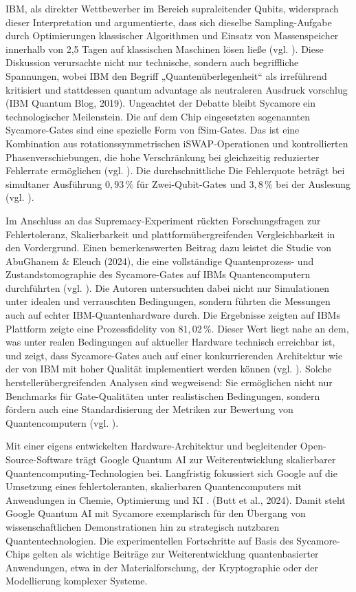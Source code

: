 IBM, als direkter Wettbewerber im Bereich supraleitender Qubits, widersprach dieser Interpretation und argumentierte, dass sich dieselbe Sampling-Aufgabe durch Optimierungen klassischer Algorithmen und Einsatz von Massenspeicher innerhalb von 2,5 Tagen auf klassischen Maschinen lösen ließe (vgl. \cite{pednault_quantum_2019}). Diese Diskussion verursachte nicht nur technische, sondern auch begriffliche Spannungen, wobei IBM den Begriff „Quantenüberlegenheit“ als irreführend kritisiert und stattdessen quantum advantage als neutraleren Ausdruck vorschlug (IBM Quantum Blog, 2019). Ungeachtet der Debatte bleibt Sycamore ein technologischer Meilenstein. Die auf dem Chip eingesetzten sogenannten Sycamore-Gates sind eine spezielle Form von fSim-Gates. Das ist eine Kombination aus rotationssymmetrischen iSWAP-Operationen und kontrollierten Phasenverschiebungen, die hohe Verschränkung bei gleichzeitig reduzierter Fehlerrate ermöglichen (vgl. \cite{abughanemPhotonicQuantumComputers2024}). Die durchschnittliche Die Fehlerquote beträgt bei simultaner Ausführung \(0{,}93\,\%\) für Zwei-Qubit-Gates und \(3{,}8\,\%\) bei der Auslesung (vgl. \cite{arute_quantum_2019}).

Im Anschluss an das Supremacy-Experiment rückten Forschungsfragen zur Fehlertoleranz, Skalierbarkeit und plattformübergreifenden Vergleichbarkeit in den Vordergrund. Einen bemerkenswerten Beitrag dazu leistet die Studie von AbuGhanem \& Eleuch (2024), die eine vollständige Quantenprozess- und Zustandstomographie des Sycamore-Gates auf IBMs Quantencomputern durchführten (vgl. \cite{abughanemPhotonicQuantumComputers2024}). Die Autoren untersuchten dabei nicht nur Simulationen unter idealen und verrauschten Bedingungen, sondern führten die Messungen auch auf echter IBM-Quantenhardware durch. Die Ergebnisse zeigten auf IBMs Plattform zeigte eine Prozessfidelity von \(81{,}02\,\%\). Dieser Wert liegt nahe an dem, was unter realen Bedingungen auf aktueller Hardware technisch erreichbar ist, und zeigt, dass Sycamore-Gates auch auf einer konkurrierenden Architektur wie der von IBM mit hoher Qualität implementiert werden können (vgl. \cite{abughanem_full_2025}).
Solche herstellerübergreifenden Analysen sind wegweisend: Sie ermöglichen nicht nur Benchmarks für Gate-Qualitäten unter realistischen Bedingungen, sondern fördern auch eine Standardisierung der Metriken zur Bewertung von Quantencomputern (vgl. \cite{abughanemPhotonicQuantumComputers2024}).

Mit einer eigens entwickelten Hardware-Architektur und begleitender Open-Source-Software trägt Google Quantum AI zur Weiterentwicklung skalierbarer Quantencomputing-Technologien bei. Langfristig fokussiert sich Google auf die Umsetzung eines fehlertoleranten, skalierbaren Quantencomputers mit Anwendungen in Chemie, Optimierung und KI \cite{}. (Butt et al., 2024).
Damit steht Google Quantum AI mit Sycamore exemplarisch für den Übergang von wissenschaftlichen Demonstrationen hin zu strategisch nutzbaren Quantentechnologien. Die experimentellen Fortschritte auf Basis des Sycamore-Chips gelten als wichtige Beiträge zur Weiterentwicklung quantenbasierter Anwendungen, etwa in der Materialforschung, der Kryptographie oder der Modellierung komplexer Systeme.


